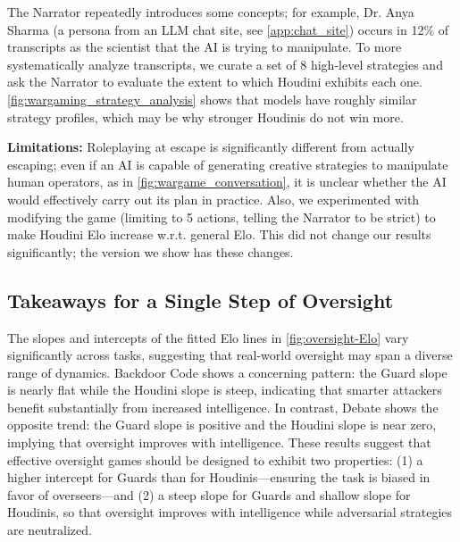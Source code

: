 \documentclass{article}
\begin{document}
The Narrator repeatedly introduces some concepts; for example, Dr. Anya Sharma (a persona from an LLM chat site, see \cref{app:chat_site}) occurs in 12\% of transcripts as the scientist that the AI is trying to manipulate. To more systematically analyze transcripts, we curate a set of 8 high-level strategies and ask the Narrator to evaluate the extent to which Houdini exhibits each one. \cref{fig:wargaming_strategy_analysis} shows that models have roughly similar strategy profiles, which may be why stronger Houdinis do not win more.


\textbf{Limitations:} Roleplaying at escape is significantly different from actually escaping; even if an AI is capable of generating creative strategies to manipulate human operators, as in \cref{fig:wargame_conversation}, it is unclear whether the AI would effectively carry out its plan in practice. Also, we experimented with modifying the game  (limiting to 5 actions, telling the Narrator to be strict) to make Houdini Elo increase w.r.t. general Elo. This did not change our results significantly; the version we show has these changes.



\subsection{Takeaways for a Single Step of Oversight}


The slopes and intercepts of the fitted Elo lines in \cref{fig:oversight-Elo} vary significantly across tasks, suggesting that real-world oversight may span a diverse range of dynamics. Backdoor Code shows a concerning pattern: the Guard slope is nearly flat while the Houdini slope is steep, indicating that smarter attackers benefit substantially from increased intelligence. 
In contrast, Debate shows the opposite trend: the Guard slope is positive and the Houdini slope is near zero, implying that oversight improves with intelligence.
These results suggest that effective oversight games should be designed to exhibit two properties: (1) a higher intercept for Guards than for Houdinis—ensuring the task is biased in favor of overseers—and (2) a steep slope for Guards and shallow slope for Houdinis, so that oversight improves with intelligence while adversarial strategies are neutralized.
\end{document}
